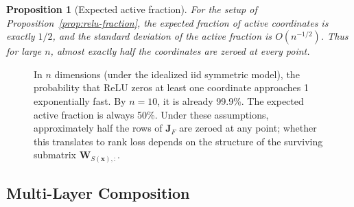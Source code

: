 \documentclass[11pt,a4paper]{article}
\newtheorem{proposition}[theorem]{Proposition}
\theoremstyle{remark}
\begin{document}
\begin{proposition}[Expected active fraction]
For the setup of Proposition~\ref{prop:relu-fraction}, the expected fraction of active coordinates is exactly $1/2$, and the standard deviation of the active fraction is $O(n^{-1/2})$.
Thus for large $n$, almost exactly half the coordinates are zeroed at every point.
\end{proposition}

\begin{figure}[ht]
\centering
{}
\caption{In $n$ dimensions (under the idealized iid symmetric model), the probability that ReLU zeros at least one coordinate approaches 1 exponentially fast.
By $n = 10$, it is already 99.9\%.  The expected active fraction is always 50\%.
Under these assumptions, approximately half the rows of $\mathbf{J}_F$ are zeroed at any point; whether this translates to rank loss depends on the structure of the surviving submatrix $\mathbf{W}_{S(\mathbf{x}),:}$.}
\label{fig:highdim}
\end{figure}


\subsection{Multi-Layer Composition}
\end{document}
